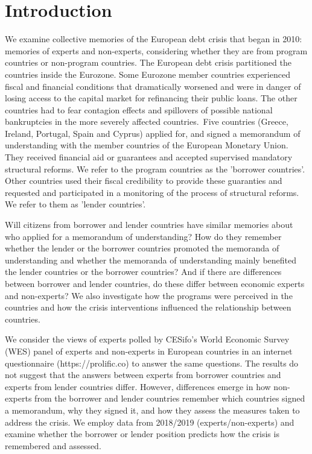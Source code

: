 \section{Introduction}

We examine collective memories of the European debt crisis that
began in 2010: memories of experts and non-experts, considering whether they are from program countries or non-program countries.
The European debt crisis partitioned the countries inside the Eurozone. Some
Eurozone member countries experienced fiscal and financial conditions that
dramatically worsened and were in danger of losing access to the capital
market for refinancing their public loans. The other countries had to
fear contagion effects and spillovers of possible national
bankruptcies in the more severely affected countries.\ Five countries
(Greece, Ireland, Portugal, Spain and Cyprus) applied for, and signed a
memorandum of understanding with the member countries of the European
Monetary Union. They received financial aid or
guarantees and accepted supervised mandatory structural reforms. We refer to the program
countries as the 'borrower countries'. Other countries used their fiscal credibility to provide these guaranties and requested
and participated in a monitoring of the process of structural reforms. We
refer to them as 'lender countries'.

Will citizens from borrower and lender countries have similar memories about who
applied for a memorandum of understanding? How do they remember
whether the lender or the borrower countries promoted the memoranda of understanding and whether
the memoranda of understanding mainly benefited the lender countries or the
borrower countries? And if there are differences between borrower and lender countries, do these differ between economic experts and non-experts? We also
investigate how the programs were perceived in the countries
and how the crisis interventions influenced the relationship between
countries.\ 

We consider the views of experts polled by CESifo's World Economic Survey (WES) panel of experts and non-experts in European countries in an internet questionnaire (https://prolific.co) to answer the same questions. The results do not suggest that the answers between experts from borrower countries and experts from lender countries differ. However, differences emerge in how non-experts from the borrower and lender countries remember which countries signed a memorandum, why they signed it, and how they assess the measures taken to address the crisis. We employ data from 2018/2019 (experts/non-experts) and examine whether the borrower or lender position predicts how the crisis is remembered and assessed. 

